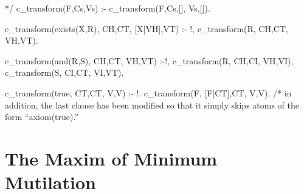 \documentclass{book}[9pt]
\newenvironment{code}%
{\small \verbatim}%
{\endverbatim \large}
\begin{document}
\begin{code}
*/
c_transform(F,Cs,Vs) :- c_transform(F,Cs,[], Vs,[]).

c_transform(exists(X,R), CH,CT, [X|VH],VT) :- !,
        c_transform(R, CH,CT, VH,VT).

c_transform(and(R,S), CH,CT, VH,VT) :-!,
        c_transform(R, CH,CI, VH,VI),
        c_transform(S, CI,CT, VI,VT).

c_transform(true, CT,CT, V,V) :- !.
c_transform(F, [F|CT],CT, V,V).
/*
\end{code}
\noindent in addition, the last clause has been modified so that it simply
skips atoms of the form ``axiom(true).''

\section{The Maxim of Minimum Mutilation}
\end{document}
